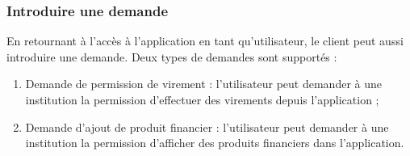 \documentclass{article}
\begin{document}
\subsubsection{Introduire une demande}
En retournant à l'accès à l'application en tant qu'utilisateur, le client peut aussi introduire une demande. Deux types de demandes sont supportés :
\begin{enumerate}
\item Demande de permission de virement : l'utilisateur peut demander à une institution la permission d'effectuer des virements depuis l'application ;
\item Demande d'ajout de produit financier : l'utilisateur peut demander à une institution la permission d'afficher des produits financiers dans l'application.
\end{enumerate}
\end{document}
